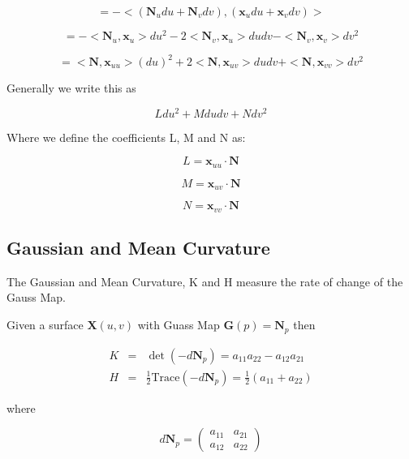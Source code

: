 \begin{displaymath}
= -<(\mathbf N_u du + \mathbf N_v dv ) , ( \mathbf x_u du+ \mathbf x_v dv) >
\end{displaymath}

\begin{displaymath}
= -<\mathbf N_u, \mathbf x_u> du^2 - 2<\mathbf N_v, \mathbf x_u>du dv -<\mathbf N_v, \mathbf x_v> dv^2
\end{displaymath}

\begin{displaymath}
= <\mathbf N, \mathbf x_{uu}>(du)^2 + 2<\mathbf N, \mathbf x_{uv}>du dv + <\mathbf N, \mathbf x_{vv}> dv^2
\end{displaymath}

Generally we write this as

\begin{displaymath}
L du^2 + M du dv + N dv^2
\end{displaymath}

Where we define the coefficients L, M and N as:

\begin{displaymath}
L = \mathbf x_{uu} \cdot \mathbf N
\end{displaymath}

\begin{displaymath}
M = \mathbf x_{uv} \cdot \mathbf N
\end{displaymath}

\begin{displaymath}
N = \mathbf x_{vv} \cdot \mathbf N
\end{displaymath}

\subsection{Gaussian and Mean Curvature}
\label{MeanCurve}
The Gaussian and Mean Curvature, K and H measure the rate of change of the Gauss Map.

Given a surface $\mathbf{X}(u,v)$ with Guass Map $\mathbf{G}(p) = \mathbf N_p$ then

\begin{eqnarray}
\nonumber
K &=& \det(-d\mathbf N_p) = a_{11}a_{22} - a_{12}a_{21} \\
\nonumber
H &=& \frac{1}{2}\mbox{Trace}(-d\mathbf N_p) = \frac{1}{2}(a_{11}+ a_{22})
\end{eqnarray}

where 

\begin{displaymath}
d\mathbf N_p =
\left( \begin{array}{cc}
a_{11} & a_{21} \\
a_{12} & a_{22}
\end{array} \right)
\end{displaymath}

